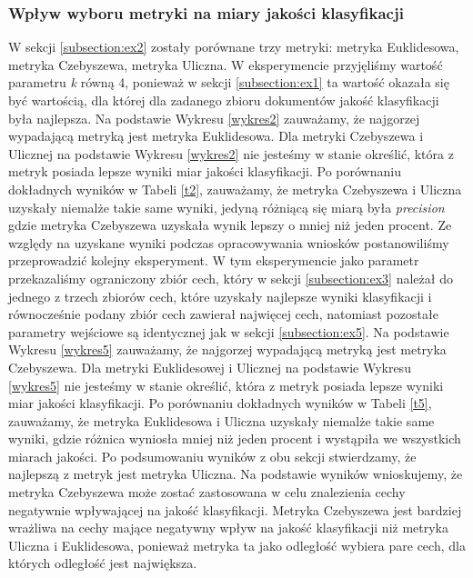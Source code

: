\documentclass{classrep}
\begin{document}
\subsubsection{Wpływ wyboru metryki na miary jakości klasyfikacji}
W sekcji \ref{subsection:ex2} zostały porównane trzy metryki: metryka Euklidesowa, metryka Czebyszewa, metryka Uliczna. W eksperymencie przyjęliśmy wartość parametru \textit{k} równą 4, ponieważ w sekcji \ref{subsection:ex1}  ta wartość okazała się być wartością, dla której dla zadanego zbioru dokumentów jakość klasyfikacji była najlepsza. Na podstawie Wykresu \ref{wykres2} zauważamy, że najgorzej wypadającą metryką jest metryka Euklidesowa. Dla metryki Czebyszewa i Ulicznej na podstawie Wykresu \ref{wykres2} nie jesteśmy w stanie określić, która z metryk posiada lepsze wyniki miar jakości klasyfikacji. Po porównaniu dokładnych wyników w Tabeli \ref{t2}, zauważamy, że metryka Czebyszewa i Uliczna uzyskały niemalże takie same wyniki, jedyną różniącą się miarą była \textit{precision} gdzie metryka Czebyszewa uzyskała wynik lepszy o mniej niż jeden procent.
\newline
Ze względy na uzyskane wyniki podczas opracowywania wniosków postanowiliśmy przeprowadzić kolejny eksperyment. W tym eksperymencie jako parametr przekazaliśmy ograniczony zbiór cech, który w sekcji \ref{subsection:ex3} należał do jednego z trzech zbiorów cech, które uzyskały najlepsze wyniki klasyfikacji i równocześnie podany zbiór cech zawierał najwięcej cech, natomiast pozostałe parametry wejściowe są identycznej jak w sekcji \ref{subsection:ex5}.  Na podstawie Wykresu \ref{wykres5} zauważamy, że najgorzej wypadającą metryką jest metryka Czebyszewa. Dla metryki Euklidesowej i Ulicznej na podstawie Wykresu \ref{wykres5} nie jesteśmy w stanie określić, która z metryk posiada lepsze wyniki miar jakości klasyfikacji. Po porównaniu dokładnych wyników w Tabeli \ref{t5}, zauważamy, że metryka Euklidesowa i Uliczna uzyskały niemalże takie same wyniki, gdzie różnica wyniosła mniej niż jeden procent i wystąpiła we wszystkich miarach jakości.
\newline
Po podsumowaniu wyników z obu sekcji stwierdzamy, że najlepszą z metryk jest metryka Uliczna. Na podstawie wyników wnioskujemy, że metryka Czebyszewa może zostać zastosowana w celu znalezienia cechy negatywnie wpływającej na jakość klasyfikacji. Metryka Czebyszewa jest bardziej wrażliwa na cechy mające negatywny wpływ na jakość klasyfikacji niż metryka Uliczna i Euklidesowa, ponieważ metryka ta jako odległość wybiera pare cech, dla których odległość jest największa. 
\end{document}
